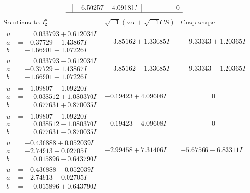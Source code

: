 \documentclass[1p]{elsarticle_modified}
\theoremstyle{definition}
\newcommand{\I}{\sqrt{-1}}
\begin{document}
$$\begin{array}{c|c|c}
 & -6.50257 - 4.09181 I & \phantom{-0.000000 } 0\\
 \hline 
 \end{array}$$\newpage$$\begin{array}{c|c|c}  
\text{Solutions to }I^u_{2}& \I (\text{vol} + \sqrt{-1}CS) & \text{Cusp shape}\\
 \hline 
\begin{aligned}
u &= \phantom{-}0.033793 + 0.612034 I \\
a &= -0.37729 - 1.43867 I \\
b &= -1.66901 - 1.07226 I\end{aligned}
 & \phantom{-}3.85162 + 1.33085 I & \phantom{-}9.33343 + 1.20365 I \\ \hline\begin{aligned}
u &= \phantom{-}0.033793 - 0.612034 I \\
a &= -0.37729 + 1.43867 I \\
b &= -1.66901 + 1.07226 I\end{aligned}
 & \phantom{-}3.85162 - 1.33085 I & \phantom{-}9.33343 - 1.20365 I \\ \hline\begin{aligned}
u &= -1.09807 + 1.09220 I \\
a &= \phantom{-}0.038512 + 1.080370 I \\
b &= \phantom{-}0.677631 + 0.870035 I\end{aligned}
 & -0.19423 + 4.09608 I & \phantom{-0.000000 } 0 \\ \hline\begin{aligned}
u &= -1.09807 - 1.09220 I \\
a &= \phantom{-}0.038512 - 1.080370 I \\
b &= \phantom{-}0.677631 - 0.870035 I\end{aligned}
 & -0.19423 - 4.09608 I & \phantom{-0.000000 } 0 \\ \hline\begin{aligned}
u &= -0.436888 + 0.052039 I \\
a &= -2.74913 - 0.02705 I \\
b &= \phantom{-}0.015896 - 0.643790 I\end{aligned}
 & -2.99458 + 7.31406 I & -5.67566 - 6.83311 I \\ \hline\begin{aligned}
u &= -0.436888 - 0.052039 I \\
a &= -2.74913 + 0.02705 I \\
b &= \phantom{-}0.015896 + 0.643790 I\end{aligned}

\end{array}$$
\end{document}
